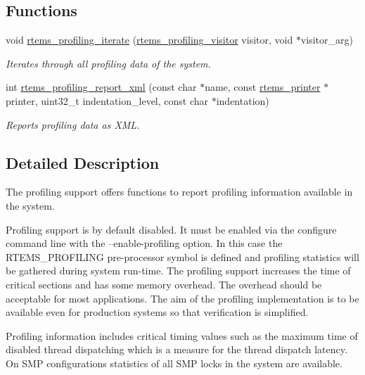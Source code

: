 \subsection*{Functions}
\begin{DoxyCompactItemize}
\item 
void \mbox{\hyperlink{group__Profiling_ga4edc3fa059af092c478bdd95ffbb177e}{rtems\+\_\+profiling\+\_\+iterate}} (\mbox{\hyperlink{group__Profiling_gabc727db53114f2f1bedd000b4d8b38ba}{rtems\+\_\+profiling\+\_\+visitor}} visitor, void $\ast$visitor\+\_\+arg)
\begin{DoxyCompactList}\small\item\em Iterates through all profiling data of the system. \end{DoxyCompactList}\item 
int \mbox{\hyperlink{group__Profiling_gae1d3b285861598637ed453b7084896ed}{rtems\+\_\+profiling\+\_\+report\+\_\+xml}} (const char $\ast$name, const \mbox{\hyperlink{structrtems__printer}{rtems\+\_\+printer}} $\ast$printer, uint32\+\_\+t indentation\+\_\+level, const char $\ast$indentation)
\begin{DoxyCompactList}\small\item\em Reports profiling data as X\+ML. \end{DoxyCompactList}\end{DoxyCompactItemize}


\subsection{Detailed Description}
The profiling support offers functions to report profiling information available in the system. 

Profiling support is by default disabled. It must be enabled via the configure command line with the {\ttfamily --enable-\/profiling} option. In this case the R\+T\+E\+M\+S\+\_\+\+P\+R\+O\+F\+I\+L\+I\+NG pre-\/processor symbol is defined and profiling statistics will be gathered during system run-\/time. The profiling support increases the time of critical sections and has some memory overhead. The overhead should be acceptable for most applications. The aim of the profiling implementation is to be available even for production systems so that verification is simplified.

Profiling information includes critical timing values such as the maximum time of disabled thread dispatching which is a measure for the thread dispatch latency. On S\+MP configurations statistics of all S\+MP locks in the system are available.


